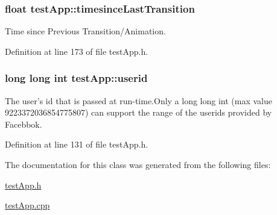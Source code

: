 \hypertarget{classtest_app_acb60fb8a89e9ec5d461630a20b11ceda}{
\subsubsection[{timesince\-Last\-Transition}]{\setlength{\rightskip}{0pt plus 5cm}float test\-App\-::timesince\-Last\-Transition}}\label{classtest_app_acb60fb8a89e9ec5d461630a20b11ceda}


Time since Previous Transition/\-Animation. 



Definition at line 173 of file test\-App.\-h.

\hypertarget{classtest_app_a6ae76dc97fbeee00755f4a6cd6b87e19}{
\subsubsection[{userid}]{\setlength{\rightskip}{0pt plus 5cm}long long int test\-App\-::userid}}\label{classtest_app_a6ae76dc97fbeee00755f4a6cd6b87e19}


The user's id that is passed at run-\/time.\-Only a long long int (max value 9223372036854775807) can support the range of the userids provided by Facebbok. 



Definition at line 131 of file test\-App.\-h.



The documentation for this class was generated from the following files\-:\begin{DoxyCompactItemize}
\item 
\hyperlink{test_app_8h}{test\-App.\-h}\item 
\hyperlink{test_app_8cpp}{test\-App.\-cpp}\end{DoxyCompactItemize}
